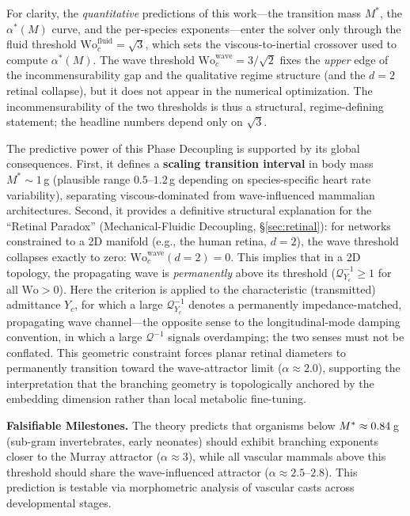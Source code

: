 For clarity, the \emph{quantitative} predictions of this work---the
transition mass $M^*$, the $\alpha^*(M)$ curve, and the per-species
exponents---enter the solver only through the fluid threshold
$\mathrm{Wo}_c^{\mathrm{fluid}}=\sqrt{3}$, which sets the viscous-to-inertial
crossover used to compute $\alpha^*(M)$. The wave threshold
$\mathrm{Wo}_c^{\mathrm{wave}}=3/\sqrt{2}$ fixes the \emph{upper} edge of the
incommensurability gap and the qualitative regime structure (and the $d=2$
retinal collapse), but it does not appear in the numerical optimization. The
incommensurability of the two thresholds is thus a structural, regime-defining
statement; the headline numbers depend only on $\sqrt{3}$.

The predictive power of this Phase Decoupling is supported by its global
consequences. First, it defines a \textbf{scaling transition interval} in body
mass $M^* \sim 1\,$g (plausible range $0.5\text{--}1.2\,$g depending on
species-specific heart rate variability), separating viscous-dominated from
wave-influenced mammalian architectures. Second, it provides a definitive
structural explanation for the ``Retinal Paradox'' (Mechanical-Fluidic
Decoupling, \S\ref{sec:retinal}): for networks constrained to a 2D manifold
(e.g., the human retina, $d=2$), the wave threshold collapses exactly to zero:
$\mathrm{Wo}_c^{\mathrm{wave}}(d{=}2) = 0$. This implies that in a 2D topology,
the propagating wave is \emph{permanently} above its threshold
($\mathcal{Q}^{-1}_{Y_c} \ge 1$ for all $\mathrm{Wo} > 0$). Here the
criterion is applied to the characteristic (transmitted) admittance $Y_c$, for
which a large $\mathcal{Q}^{-1}_{Y_c}$ denotes a permanently impedance-matched,
propagating wave channel---the opposite sense to the longitudinal-mode damping
convention, in which a large $\mathcal{Q}^{-1}$ signals overdamping; the two
senses must not be conflated. This geometric constraint forces planar retinal
diameters to permanently transition toward the wave-attractor limit ($\alpha
\approx 2.0$), supporting the interpretation that the branching geometry
is topologically anchored by the embedding dimension rather than local metabolic
fine-tuning.

\textbf{Falsifiable Milestones.} The theory predicts that organisms below $M^*
\approx 0.84\,$g (sub-gram invertebrates, early neonates) should exhibit
branching exponents closer to the Murray attractor ($\alpha \approx 3$), while
all vascular mammals above this threshold should share the wave-influenced
attractor ($\alpha \approx 2.5$--$2.8$). This prediction is testable via
morphometric analysis of vascular casts across developmental stages.

